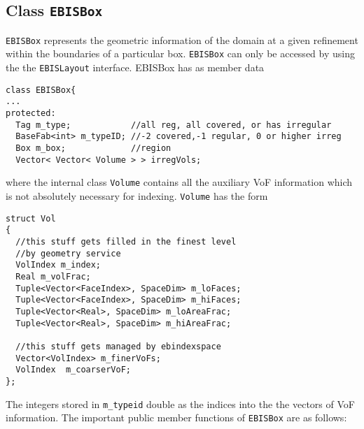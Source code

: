 \subsection{Class {\tt EBISBox}}
\label{sec::ebisbox}

{\tt EBISBox} represents the geometric information
of the domain at a given refinement 
within the boundaries of a particular box.
{\tt EBISBox} can only be accessed by using the
the {\tt EBISLayout} interface.  
EBISBox has as member data
\begin{small}
\begin{verbatim}
class EBISBox{
...
protected:
  Tag m_type;            //all reg, all covered, or has irregular
  BaseFab<int> m_typeID; //-2 covered,-1 regular, 0 or higher irreg
  Box m_box;             //region
  Vector< Vector< Volume > > irregVols;  
\end{verbatim}
\end{small}
where the internal class {\tt Volume} contains all
the auxiliary VoF information which is not absolutely
necessary for indexing. {\tt Volume} has the form
\begin{small}
\begin{verbatim}
struct Vol
{
  //this stuff gets filled in the finest level
  //by geometry service
  VolIndex m_index;
  Real m_volFrac;
  Tuple<Vector<FaceIndex>, SpaceDim> m_loFaces;
  Tuple<Vector<FaceIndex>, SpaceDim> m_hiFaces;
  Tuple<Vector<Real>, SpaceDim> m_loAreaFrac;
  Tuple<Vector<Real>, SpaceDim> m_hiAreaFrac;

  //this stuff gets managed by ebindexspace
  Vector<VolIndex> m_finerVoFs;
  VolIndex  m_coarserVoF;
};
\end{verbatim}
\end{small}
The integers stored in \verb/m_typeid/ double as the indices into
the the vectors of VoF information.  
The important public
member functions of {\tt EBISBox} are as follows:
